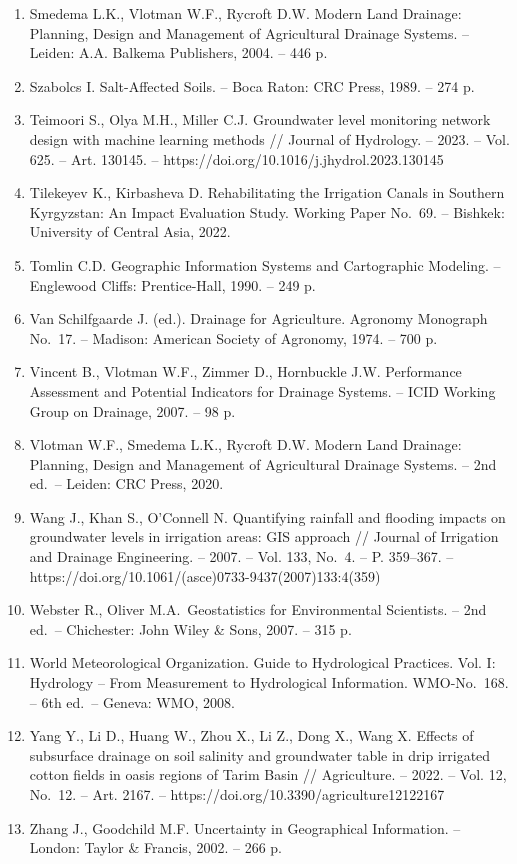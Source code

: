 \documentclass[14pt,a4paper,oneside]{extreport}
\begin{document}
\begin{enumerate}
  Vol. 55, No.~4. -- P. 1509--1522. --
  https://doi.org/10.13031/2013.42259
\item
  Smedema L.K., Vlotman W.F., Rycroft D.W. Modern Land Drainage:
  Planning, Design and Management of Agricultural Drainage Systems. --
  Leiden: A.A. Balkema Publishers, 2004. -- 446 p.
\item
  Szabolcs I. Salt-Affected Soils. -- Boca Raton: CRC Press, 1989. --
  274 p.
\item
  Teimoori S., Olya M.H., Miller C.J. Groundwater level monitoring
  network design with machine learning methods // Journal of Hydrology.
  -- 2023. -- Vol. 625. -- Art. 130145. --
  https://doi.org/10.1016/j.jhydrol.2023.130145
\item
  Tilekeyev K., Kirbasheva D. Rehabilitating the Irrigation Canals in
  Southern Kyrgyzstan: An Impact Evaluation Study. Working Paper No.~69.
  -- Bishkek: University of Central Asia, 2022.
\item
  Tomlin C.D. Geographic Information Systems and Cartographic Modeling.
  -- Englewood Cliffs: Prentice-Hall, 1990. -- 249 p.
\item
  Van Schilfgaarde J. (ed.). Drainage for Agriculture. Agronomy
  Monograph No.~17. -- Madison: American Society of Agronomy, 1974. --
  700 p.
\item
  Vincent B., Vlotman W.F., Zimmer D., Hornbuckle J.W. Performance
  Assessment and Potential Indicators for Drainage Systems. -- ICID
  Working Group on Drainage, 2007. -- 98 p.
\item
  Vlotman W.F., Smedema L.K., Rycroft D.W. Modern Land Drainage:
  Planning, Design and Management of Agricultural Drainage Systems. --
  2nd ed.~-- Leiden: CRC Press, 2020.
\item
  Wang J., Khan S., O'Connell N. Quantifying rainfall and flooding
  impacts on groundwater levels in irrigation areas: GIS approach //
  Journal of Irrigation and Drainage Engineering. -- 2007. -- Vol. 133,
  No.~4. -- P. 359--367. --
  https://doi.org/10.1061/(asce)0733-9437(2007)133:4(359)
\item
  Webster R., Oliver M.A.~Geostatistics for Environmental Scientists. --
  2nd ed.~-- Chichester: John Wiley \& Sons, 2007. -- 315 p.
\item
  World Meteorological Organization. Guide to Hydrological Practices.
  Vol. I: Hydrology -- From Measurement to Hydrological Information.
  WMO-No.~168. -- 6th ed.~-- Geneva: WMO, 2008.
\item
  Yang Y., Li D., Huang W., Zhou X., Li Z., Dong X., Wang X. Effects of
  subsurface drainage on soil salinity and groundwater table in drip
  irrigated cotton fields in oasis regions of Tarim Basin //
  Agriculture. -- 2022. -- Vol. 12, No.~12. -- Art. 2167. --
  https://doi.org/10.3390/agriculture12122167
\item
  Zhang J., Goodchild M.F. Uncertainty in Geographical Information. --
  London: Taylor \& Francis, 2002. -- 266 p.
\end{enumerate}
\end{document}
